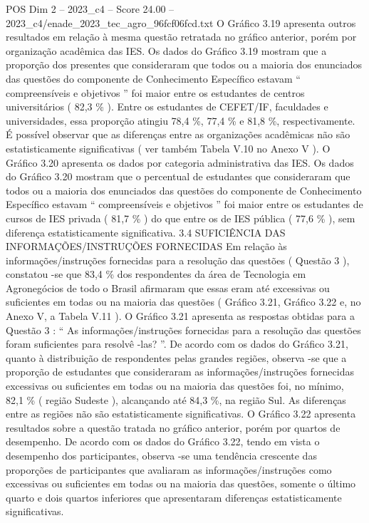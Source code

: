 \begin{textsample}{POS Dim 2 – 2023\_c4 – Score 24.00 – 2023\_c4/enade\_2023\_tec\_agro\_96fcf06fcd.txt}
O Gráfico 3.19 apresenta outros resultados em relação à mesma questão retratada no gráfico anterior, porém por organização acadêmica das IES.
Os dados do Gráfico 3.19 mostram que a proporção dos presentes que consideraram que todos ou a maioria dos enunciados das questões do componente de Conhecimento Específico estavam “ compreensíveis e objetivos ” foi maior entre os estudantes de centros universitários ( 82,3 \% ).
Entre os estudantes de CEFET/IF, faculdades e universidades, essa proporção atingiu 78,4 \%, 77,4 \% e 81,8 \%, respectivamente.
É possível observar que as diferenças entre as organizações acadêmicas não são estatisticamente significativas ( ver também Tabela V.10 no Anexo V ).
O Gráfico 3.20 apresenta os dados por categoria administrativa das IES.
Os dados do Gráfico 3.20 mostram que o percentual de estudantes que consideraram que todos ou a maioria dos enunciados das questões do componente de Conhecimento Específico estavam “ compreensíveis e objetivos ” foi maior entre os estudantes de cursos de IES privada ( 81,7 \% ) do que entre os de IES pública ( 77,6 \% ), sem diferença estatisticamente significativa. 3.4 SUFICIÊNCIA DAS INFORMAÇÕES/INSTRUÇÕES FORNECIDAS Em relação às informações/instruções fornecidas para a resolução das questões ( Questão 3 ), constatou -se que 83,4 \% dos respondentes da área de Tecnologia em Agronegócios de todo o Brasil afirmaram que essas eram até excessivas ou suficientes em todas ou na maioria das questões ( Gráfico 3.21, Gráfico 3.22 e, no Anexo V, a Tabela V.11 ).
O Gráfico 3.21 apresenta as respostas obtidas para a Questão 3 : “ As informações/instruções fornecidas para a resolução das questões foram suficientes para resolvê -las? ”.
De acordo com os dados do Gráfico 3.21, quanto à distribuição de respondentes pelas grandes regiões, observa -se que a proporção de estudantes que consideraram as informações/instruções fornecidas excessivas ou suficientes em todas ou na maioria das questões foi, no mínimo, 82,1 \% ( região Sudeste ), alcançando até 84,3 \%, na região Sul.
As diferenças entre as regiões não são estatisticamente significativas.
O Gráfico 3.22 apresenta resultados sobre a questão tratada no gráfico anterior, porém por quartos de desempenho.
De acordo com os dados do Gráfico 3.22, tendo em vista o desempenho dos participantes, observa -se uma tendência crescente das proporções de participantes que avaliaram as informações/instruções como excessivas ou suficientes em todas ou na maioria das questões, somente o último quarto e dois quartos inferiores que apresentaram diferenças estatisticamente significativas.

\end{textsample}
